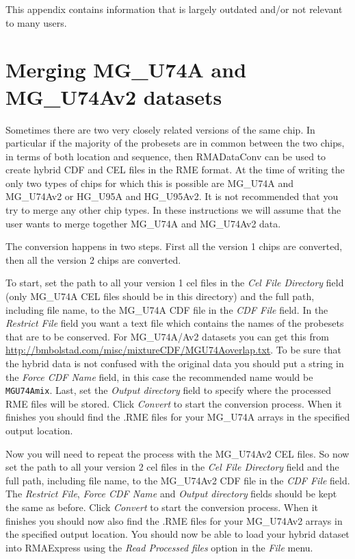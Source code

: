 \documentclass[11pt]{report}
\begin{document}
This appendix contains information that is largely outdated and/or not relevant to many users.

\section{Merging MG\_U74A and MG\_U74Av2 datasets}

Sometimes there are two very closely related versions of the same chip. In particular if the majority of the probesets are in common between the two chips, in terms of both location and sequence, then RMADataConv can be used to create hybrid CDF and CEL files in the RME format. At the time of writing the only two types of chips for which this is possible are  MG\_U74A and MG\_U74Av2  or HG\_U95A and  HG\_U95Av2. It is not recommended that you try to merge any other chip types. In these instructions we will assume that the user wants to merge together MG\_U74A and MG\_U74Av2 data.

The conversion happens in two steps. First all the version 1 chips are converted, then all the version 2 chips are converted. 

To start, set the path to all your version 1 cel files in the {\it Cel File Directory} field (only MG\_U74A CEL files should be in this directory) and the full path, including file name, to the MG\_U74A CDF file in the {\it CDF File} field. In the {\it Restrict File} field  you want a text file which contains the names of the probesets that are to be conserved. For MG\_U74A/Av2 datasets you can get this from \url{http://bmbolstad.com/misc/mixtureCDF/MGU74Aoverlap.txt}. To be sure that the hybrid data is not confused with the original data you should put a string in the {\it Force CDF Name} field, in this case the recommended name would be {\tt MGU74Amix}. Last, set the {\it Output directory} field to specify where the processed RME files will be stored. Click {\it Convert} to start the conversion process. When it finishes you should find the .RME files for your MG\_U74A arrays in the specified output location. 

Now you will need to repeat the process with the MG\_U74Av2 CEL files. So now set the path to all your version 2 cel files in the {\it Cel File Directory} field and the full path, including file name, to the MG\_U74Av2 CDF file in the {\it CDF File} field. The {\it Restrict File},  {\it Force CDF Name} and  {\it Output directory} fields should be kept the same as before. Click {\it Convert} to start the conversion process. When it finishes you should now also find the .RME files for your MG\_U74Av2 arrays in the specified output location. You should now be able to load your hybrid dataset into RMAExpress using the {\it Read Processed files} option in the {\it File} menu.
\end{document}
